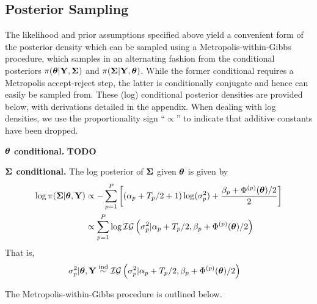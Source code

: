 \documentclass[12pt]{article}
\begin{document}
\subsection{Posterior Sampling}
The likelihood and prior assumptions specified above yield a convenient form of the posterior density which can be sampled using a Metropolis-within-Gibbs procedure, which samples in an 
alternating fashion from the conditional posteriors $\pi(\boldsymbol{\theta}|\mathbf{Y}, \boldsymbol{\Sigma})$ and $\pi(\boldsymbol{\Sigma}|\mathbf{Y}, \boldsymbol{\theta})$. While the former conditional requires a Metropolis 
accept-reject step, the latter is conditionally conjugate and hence can easily be sampled from. These (log) conditional posterior densities are provided below, with derivations detailed in 
the appendix. When dealing with log densities, we use the proportionality sign ``$\propto$'' to indicate that additive constants have been dropped. 

\bigskip
\noindent
\textbf{$\boldsymbol{\theta}$ conditional.} \textbf{TODO}

\bigskip
\noindent
\textbf{$\boldsymbol{\Sigma}$ conditional.}
The log posterior of $\boldsymbol{\Sigma}$ given $\boldsymbol{\theta}$ is given by 
\begin{align*}
\log \pi(\boldsymbol{\Sigma}|\boldsymbol{\theta}, \mathbf{Y}) &\propto -\sum_{p = 1}^{P} \left[\left(\alpha_{p} + T_{p}/2 + 1 \right)\log(\sigma_{p}^2) + \frac{\beta_{p} + 
								  \Phi^{(p)}(\boldsymbol{\theta})/2}{2} \right] \\
				      			       &\propto \sum_{p = 1}^{P} \log \mathcal{IG}\left(\sigma_{p}^2|\alpha_{p} + T_{p}/2, \beta_{p} + \Phi^{(p)}(\boldsymbol{\theta})/2 \right)
\end{align*}
That is, 
\begin{align}
\sigma_{p}^2|\boldsymbol{\theta}, \mathbf{Y} &\overset{\text{ind}}{\sim} \mathcal{IG}\left(\sigma_{p}^2|\alpha_{p} + T_{p}/2, \beta_{p} + \Phi^{(p)}(\boldsymbol{\theta})/2 \right) \label{cond_post_Cov}
\end{align}

The Metropolis-within-Gibbs procedure is outlined below. 
\end{document}
